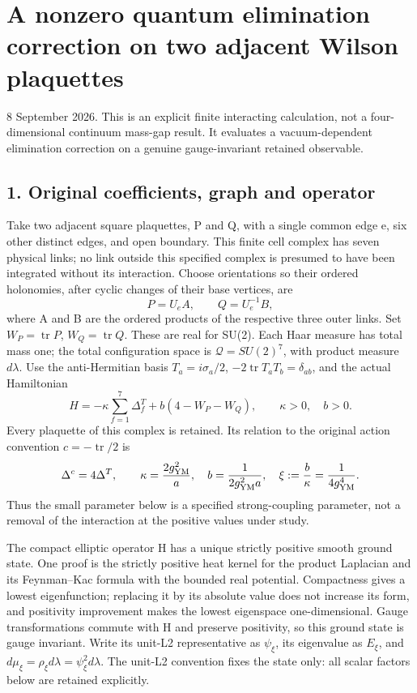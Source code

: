 \documentclass[
  11pt,
]{article}
\author{}
\date{}
\begin{document}
\section{A nonzero quantum elimination correction on two adjacent Wilson
plaquettes}\label{a-nonzero-quantum-elimination-correction-on-two-adjacent-wilson-plaquettes}

8 September 2026. This is an explicit finite interacting calculation,
not a four-dimensional continuum mass-gap result. It evaluates a
vacuum-dependent elimination correction on a genuine gauge-invariant
retained observable.

\subsection{1. Original coefficients, graph and
operator}\label{original-coefficients-graph-and-operator}

Take two adjacent square plaquettes, P and Q, with a single common edge
e, six other distinct edges, and open boundary. This finite cell complex
has seven physical links; no link outside this specified complex is
presumed to have been integrated without its interaction. Choose
orientations so their ordered holonomies, after cyclic changes of their
base vertices, are \[
 P=U_e A,\qquad Q=U_e^{-1}B,
\] where A and B are the ordered products of the respective three outer
links. Set \(W_P=\operatorname{tr}P\), \(W_Q=\operatorname{tr}Q\). These
are real for SU(2). Each Haar measure has total mass one; the total
configuration space is \(\mathcal Q=SU(2)^7\), with product measure
\(d\lambda\). Use the anti-Hermitian basis \(T_a=i\sigma_a/2\),
\(-2\operatorname{tr}T_aT_b=\delta_{ab}\), and the actual Hamiltonian \[
 H= -\kappa\sum_{f=1}^7\Delta_f^T
       +b(4-W_P-W_Q),\qquad \kappa>0,\quad b>0.
\] Every plaquette of this complex is retained. Its relation to the
original action convention \(c=-\operatorname{tr}/2\) is \[
 \Delta^c=4\Delta^T,\qquad
 \kappa=\frac{2g_{\rm YM}^2}{a},\quad
 b=\frac1{2g_{\rm YM}^2a},\quad
 \xi:=\frac b\kappa=\frac1{4g_{\rm YM}^4}.
\] Thus the small parameter below is a specified strong-coupling
parameter, not a removal of the interaction at the positive values under
study.

The compact elliptic operator H has a unique strictly positive smooth
ground state. One proof is the strictly positive heat kernel for the
product Laplacian and its Feynman--Kac formula with the bounded real
potential. Compactness gives a lowest eigenfunction; replacing it by its
absolute value does not increase its form, and positivity improvement
makes the lowest eigenspace one-dimensional. Gauge transformations
commute with H and preserve positivity, so this ground state is gauge
invariant. Write its unit-L2 representative as \(\psi_\xi\), its
eigenvalue as \(E_\xi\), and
\(d\mu_\xi=\rho_\xi d\lambda=\psi_\xi^2d\lambda\). The unit-L2
convention fixes the state only: all scalar factors below are retained
explicitly.
\end{document}
